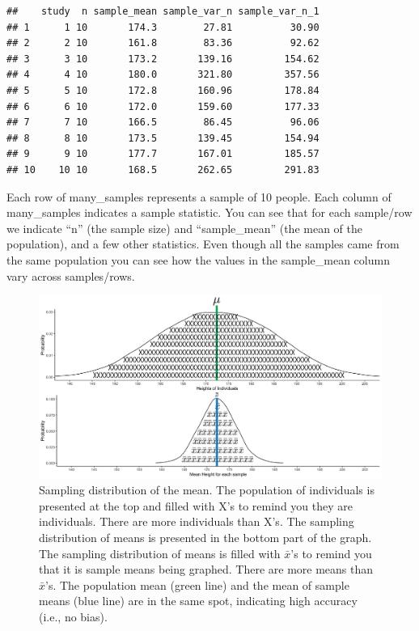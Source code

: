 \documentclass[
]{krantz}
\begin{document}
\begin{verbatim}
##    study  n sample_mean sample_var_n sample_var_n_1
## 1      1 10       174.3        27.81          30.90
## 2      2 10       161.8        83.36          92.62
## 3      3 10       173.2       139.16         154.62
## 4      4 10       180.0       321.80         357.56
## 5      5 10       172.8       160.96         178.84
## 6      6 10       172.0       159.60         177.33
## 7      7 10       166.5        86.45          96.06
## 8      8 10       173.5       139.45         154.94
## 9      9 10       177.7       167.01         185.57
## 10    10 10       168.5       262.65         291.83
\end{verbatim}

Each row of many\_samples represents a sample of 10 people. Each column of many\_samples indicates a sample statistic. You can see that for each sample/row we indicate ``n'' (the sample size) and ``sample\_mean'' (the mean of the population), and a few other statistics. Even though all the samples came from the same population you can see how the values in the sample\_mean column vary across samples/rows.

\begin{figure}
\includegraphics[width=0.8\linewidth]{ch_samples/images/sampling_dist} \caption[Sampling distribution of the mean.]{Sampling distribution of the mean. The population of individuals is presented at the top and filled with X's to remind you they are individuals. There are more individuals than X's. The sampling distribution of means is presented in the bottom part of the graph. The sampling distribution of means is filled with $\bar{x}$'s to remind you that it is sample means being graphed. There are more means than $\bar{x}$'s. The population mean (green line) and the mean of sample means (blue line) are in the same spot, indicating high accuracy (i.e., no bias).}\label{fig:bothdist}
\end{figure}
\end{document}
